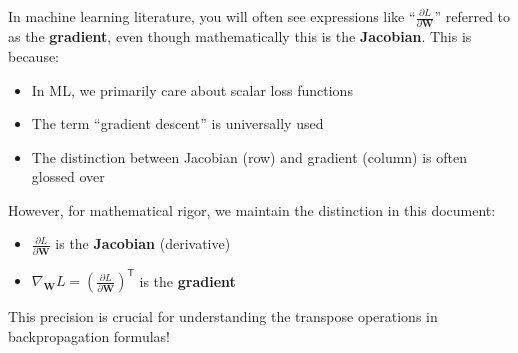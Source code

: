 \begin{notechapter}
\begin{warning}[title=Machine Learning Convention vs Mathematical Rigor]
In machine learning literature, you will often see expressions like 
``$\frac{\partial L}{\partial \mathbf{W}}$'' referred to as the 
\textbf{gradient}, even though mathematically this is the \textbf{Jacobian}. 
This is because:
\begin{itemize}[itemsep=0pt]
    \item In ML, we primarily care about scalar loss functions
    \item The term ``gradient descent'' is universally used
    \item The distinction between Jacobian (row) and gradient (column) is 
    often glossed over
\end{itemize}

However, for mathematical rigor, we maintain the distinction in this document:
\begin{itemize}[itemsep=0pt]
    \item $\frac{\partial L}{\partial \mathbf{W}}$ is the 
    \textbf{Jacobian} (derivative)
    \item $\nabla_{\mathbf{W}} L = \left(\frac{\partial L}{\partial 
    \mathbf{W}}\right)^\mathsf{T}$ is the \textbf{gradient}
\end{itemize}

This precision is crucial for understanding the transpose operations in 
backpropagation formulas!
\end{warning}

\vspace{1em}


\end{notechapter}

